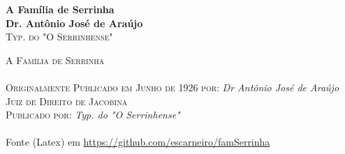 \documentclass[12pt]{book}
\begin{document}
\onecolumn
\newpage
\thispagestyle{empty}
\begin{center}
\vspace*{5cm}
\Huge{\textbf{A Família de Serrinha\\}}
\vspace*{3cm}
\huge{\textbf{Dr. Antônio José de Araújo\\}}
\vspace*{7cm}
\huge{\textsc{Typ. do "O Serrinhense"}}
\end{center}

\newpage
\thispagestyle{empty}
\noindent \textsc{A Família de Serrinha}\\\\
\noindent \textsc{Originalmente Publicado em Junho de 1926 por:}  \textit{Dr Antônio José de Araújo}\\
\noindent \textsc{Juiz de Direito de Jacobina} \\ %
\noindent \textsc{Publicado por:} \textit{Typ. do "O Serrinhense"}\\ 
\newline
{}\\ 
\noindent Fonte (Latex) em \url{https://github.com/escarneiro/famSerrinha}\\ 

\tableofcontents

\end{document}
